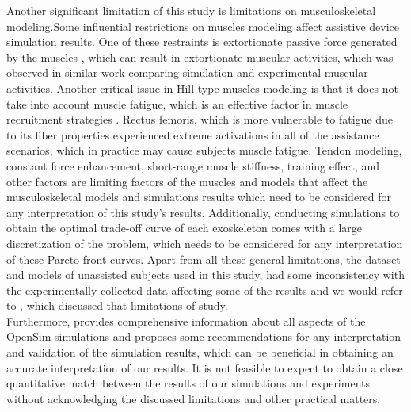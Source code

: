 \documentclass[10pt,letterpaper]{article}
\begin{document}
Another significant limitation of this study is limitations on musculoskeletal modeling.Some influential restrictions on muscles modeling affect assistive device simulation results. One of these restraints is extortionate passive force generated by the muscles \cite{92,93}, which can result in extortionate muscular activities, which was observed in similar work \cite{93} comparing simulation and experimental muscular activities. Another critical issue in Hill-type muscles modeling is that it does not take into account muscle fatigue, which is an effective factor in muscle recruitment strategies \cite{92}. Rectus femoris, which is more vulnerable to fatigue due to its fiber properties \cite{123} experienced extreme activations in all of the assistance scenarios, which in practice may cause subjects muscle fatigue\cite{122}. Tendon modeling, constant force enhancement, short-range muscle stiffness, training effect, and other factors \cite{92} are limiting factors of the muscles and models that affect the musculoskeletal models and simulations results which need to be considered for any interpretation of this study's results. Additionally, conducting simulations to obtain the optimal trade-off curve of each exoskeleton comes with a large discretization of the problem, which needs to be considered for any interpretation of these Pareto front curves. Apart from all these general limitations, the dataset and models of unassisted subjects used in this study, had some inconsistency with the experimentally collected data affecting some of the results and we would refer to \cite{93}, which discussed that limitations of study.\\
Furthermore,\cite{92} provides comprehensive information about all aspects of the OpenSim simulations and proposes some recommendations for any interpretation and validation of the simulation results, which can be beneficial in obtaining an accurate interpretation of our results. It is not feasible to expect to obtain a close quantitative match between the results of our simulations and experiments without acknowledging the discussed limitations and other practical matters.
\end{document}
